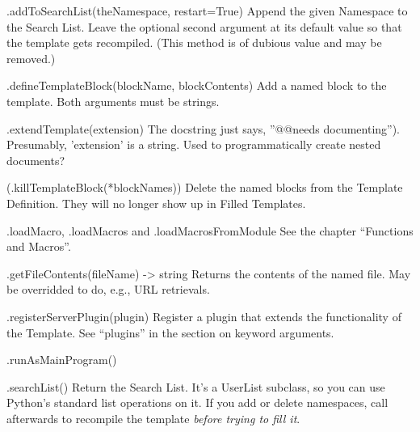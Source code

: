 \begin{description}

\item{.addToSearchList(theNamespace, restart=True)}  Append the given Namespace
     to the Search List.  Leave the optional second argument at its default
     value so that the template gets recompiled.  (This method is of dubious
     value and may be removed.)

\item{.defineTemplateBlock(blockName, blockContents)}  Add a named block to the
template.  Both arguments must be strings.


\item{.extendTemplate(extension)}  The docstring just says, ''@@needs
     documenting'').  Presumably, 'extension' is a string.  Used to 
     programmatically create nested documents?

\item(.killTemplateBlock(*blockNames))  Delete the named blocks from the 
Template Definition.  They will no longer show up in Filled Templates.


\item{.loadMacro, .loadMacros and .loadMacrosFromModule}  See the chapter
     ``Functions and Macros''.

\item{.getFileContents(fileName) -> string}  Returns the contents of the named
     file.  May be overridded to do, e.g., URL retrievals.

\item{.registerServerPlugin(plugin)}  Register a plugin that extends the
     functionality of the Template.  See ``plugins'' in the section on keyword
     arguments.

\item{.runAsMainProgram()}

\item{.searchList()}  Return the Search List.  It's a UserList subclass, so you
     can use Python's standard list operations on it.  If you add or delete
     namespaces, call  afterwards to recompile the template
     {\em before trying to fill it}.


\end{description}
